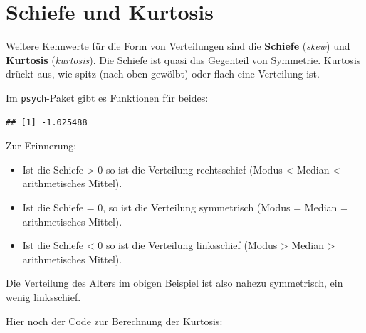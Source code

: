 \documentclass[
]{book}
\newenvironment{Shaded}{\begin{snugshade}}{\end{snugshade}}
\newcommand{\AttributeTok}[1]{\textcolor[rgb]{0.77,0.63,0.00}{#1}}
\newcommand{\ConstantTok}[1]{\textcolor[rgb]{0.00,0.00,0.00}{#1}}
\newcommand{\FunctionTok}[1]{\textcolor[rgb]{0.00,0.00,0.00}{#1}}
\newcommand{\NormalTok}[1]{#1}
\newcommand{\SpecialCharTok}[1]{\textcolor[rgb]{0.00,0.00,0.00}{#1}}
\begin{document}
\hypertarget{schiefe-und-kurtosis}{%
\section{Schiefe und Kurtosis}\label{schiefe-und-kurtosis}}

Weitere Kennwerte für die Form von Verteilungen sind die \textbf{Schiefe} (\emph{skew}) und \textbf{Kurtosis} (\emph{kurtosis}). Die Schiefe ist quasi das Gegenteil von Symmetrie. Kurtosis drückt aus, wie spitz (nach oben gewölbt) oder flach eine Verteilung ist.

Im \texttt{psych}-Paket gibt es Funktionen für beides:

\begin{Shaded}
\end{Shaded}

\begin{verbatim}
## [1] -1.025488
\end{verbatim}

Zur Erinnerung:

\begin{itemize}
\item
  Ist die Schiefe \textgreater{} 0 so ist die Verteilung rechtsschief (Modus \textless{} Median \textless{} arithmetisches Mittel).
\item
  Ist die Schiefe = 0, so ist die Verteilung symmetrisch (Modus = Median = arithmetisches Mittel).
\item
  Ist die Schiefe \textless{} 0 so ist die Verteilung linksschief (Modus \textgreater{} Median \textgreater{} arithmetisches Mittel).
\end{itemize}

Die Verteilung des Alters im obigen Beispiel ist also nahezu symmetrisch, ein wenig linksschief.

Hier noch der Code zur Berechnung der Kurtosis:

\begin{Shaded}
\end{Shaded}
\end{document}
